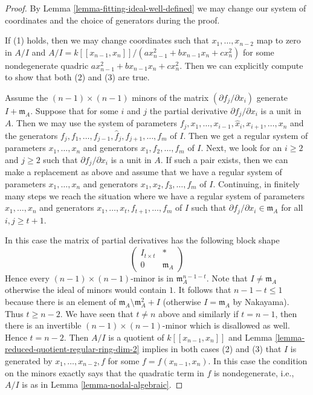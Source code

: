 \documentclass{stacks-project}
\theoremstyle{plain}
\theoremstyle{definition}
\theoremstyle{remark}
\numberwithin{equation}{subsection}
\begin{document}
\begin{proof}
By Lemma \ref{lemma-fitting-ideal-well-defined}
we may change our system of coordinates and the
choice of generators during the proof.

\medskip\noindent
If (1) holds, then we may change coordinates such that
$x_1, \ldots, x_{n - 2}$ map to zero in $A/I$ and
$A/I = k[[x_{n - 1}, x_n]]/(a x_{n - 1}^2 + b x_{n - 1}x_n + c x_n^2)$
for some nondegenerate quadric $a x_{n - 1}^2 + b x_{n - 1}x_n + c x_n^2$.
Then we can explicitly compute to show that both (2) and (3) are true.

\medskip\noindent
Assume the $(n - 1) \times (n - 1)$ minors of the matrix
$(\partial f_j/\partial x_i)$ generate $I + \mathfrak m_A$.
Suppose that for some $i$ and $j$ the partial derivative
$\partial f_j/\partial x_i$ is a unit in $A$. Then
we may use the system of parameters
$f_j, x_1, \ldots, x_{i - 1}, \hat x_i, x_{i + 1}, \ldots, x_n$
and the generators
$f_j, f_1, \ldots, f_{j - 1}, \hat f_j, f_{j + 1}, \ldots, f_m$
of $I$. Then we get a regular system of parameters $x_1, \ldots, x_n$
and generators $x_1, f_2, \ldots, f_m$ of $I$.
Next, we look for an $i \geq 2$ and $j \geq 2$ such that
$\partial f_j/\partial x_i$ is a unit in $A$. If such a pair
exists, then we can make a replacement as above and assume
that we have a regular system of parameters
$x_1, \ldots, x_n$ and generators $x_1, x_2, f_3, \ldots, f_m$ of $I$.
Continuing, in finitely many steps we reach the situation where
we have a regular system of parameters
$x_1, \ldots, x_n$ and generators
$x_1, \ldots, x_t, f_{t + 1}, \ldots, f_m$ of $I$
such that $\partial f_j/\partial x_i \in \mathfrak m_A$
for all $i, j \geq t + 1$.

\medskip\noindent
In this case the matrix of partial derivatives has the following
block shape
$$
\left(
\begin{matrix}
I_{t \times t} & * \\
0 & \mathfrak m_A
\end{matrix}
\right)
$$
Hence every $(n - 1) \times (n - 1)$-minor is in $\mathfrak m_A^{n - 1 - t}$.
Note that $I \not = \mathfrak m_A$ otherwise the ideal of minors
would contain $1$. It follows that $n - 1 - t \leq 1$ because there
is an element of $\mathfrak m_A \setminus \mathfrak m_A^2 + I$ (otherwise
$I = \mathfrak m_A$ by Nakayama). Thus $t \geq n - 2$.
We have seen that $t \not = n$ above and similarly if
$t = n - 1$, then there is an invertible $(n - 1) \times (n - 1)$-minor
which is disallowed as well. Hence $t = n - 2$.
Then $A/I$ is a quotient of $k[[x_{n - 1}, x_n]]$ and
Lemma \ref{lemma-reduced-quotient-regular-ring-dim-2}
implies in both cases (2) and (3) that $I$ is generated by
$x_1, \ldots, x_{n - 2}, f$ for some $f = f(x_{n - 1}, x_n)$.
In this case the condition on the minors exactly says that the quadratic
term in $f$ is nondegenerate, i.e., $A/I$ is as in
Lemma \ref{lemma-nodal-algebraic}.
\end{proof}
\end{document}
